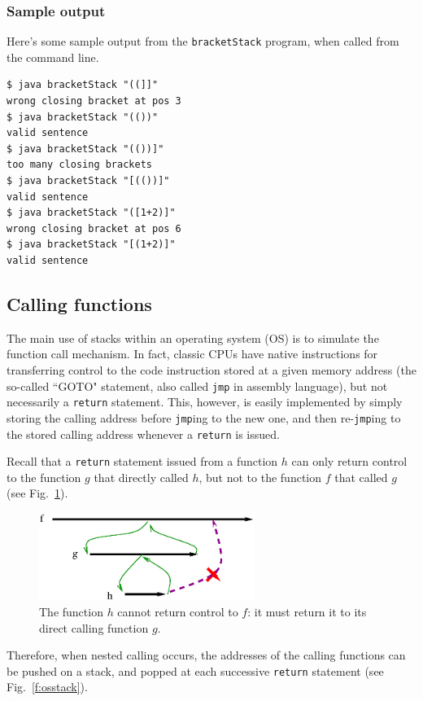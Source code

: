 \documentclass[a4paper]{book}
\theoremstyle{changebreak}                %
\begin{document}
\subsubsection{Sample output}
Here's some sample output from the {\tt bracketStack} program, when
called from the command line.
\begin{verbatim}
$ java bracketStack "((]]"
wrong closing bracket at pos 3
$ java bracketStack "(())"
valid sentence
$ java bracketStack "(())]"
too many closing brackets
$ java bracketStack "[(())]"
valid sentence
$ java bracketStack "([1+2)]"
wrong closing bracket at pos 6
$ java bracketStack "[(1+2)]"
valid sentence
\end{verbatim}

\subsection{Calling functions}
\label{s:linear:stack:function}
The main use of stacks within an operating system (OS) is to simulate the function call
mechanism. In fact, classic CPUs have native
instructions for transferring control to the code
instruction stored at a given memory
address (the so-called ``GOTO"
statement, also called {\tt jmp} in assembly
language), but not
necessarily a {\tt return} statement. This,
however, is easily implemented by simply storing the calling address
before {\tt jmp}ing to the new one, and then re-{\tt jmp}ing to the
stored calling address whenever a {\tt return} is issued.

Recall that a {\tt return} statement issued from a function $h$ can
only return control to the function $g$ that directly called $h$, but
not to the function $f$ that called $g$ (see
Fig.~\ref{f:functioncall}).
\begin{figure}[!ht]
\begin{center}
\includegraphics[width=7cm]{call_to_call}
\end{center}
\caption{The function $h$ cannot return control to $f$: it must return
  it to its direct calling function $g$.}
\label{f:functioncall}
\end{figure}
Therefore, when nested calling occurs, the
addresses of the calling functions can be pushed on a
stack, and popped at each successive {\tt return}
statement (see Fig.~\ref{f:osstack}).
\end{document}
